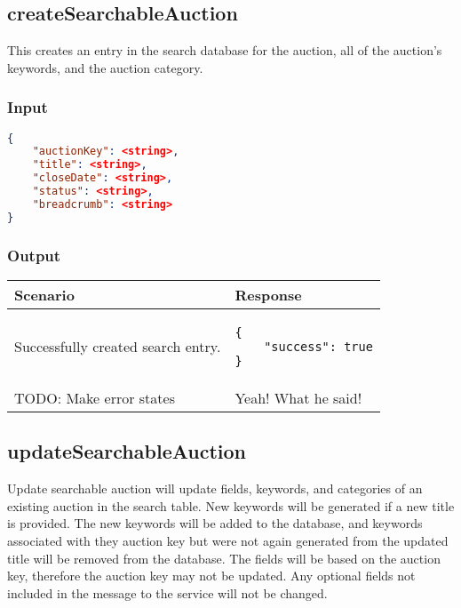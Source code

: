 \documentclass[12pt,a4paper]{article}
\begin{document}
\subsection{createSearchableAuction}
This creates an entry in the search database for the auction, all of the
auction's keywords, and the auction category.

\subsubsection{Input}
\begin{lstlisting}[language=json,firstnumber=1]
{
    "auctionKey": <string>,
    "title": <string>,
    "closeDate": <string>,
    "status": <string>,
    "breadcrumb": <string>
}
\end{lstlisting}

\subsubsection{Output}
\begin{center}
    \begin{tabular}{| p{5cm} | l |}
        \hline
        \textbf{Scenario} & \textbf{Response} \\
        \hline
        Successfully created search entry. & 
        \begin{lstlisting}[boxpos=t,language=tableJson,firstnumber=1]
{
    "success": true
}
        \end{lstlisting} \\ 
        \hline
            TODO: Make error states & Yeah! What he said! \\
        \hline
    \end{tabular}
\end{center}

\subsection{updateSearchableAuction}
Update searchable auction will update fields, keywords, and categories of an
existing auction in the search table. New keywords will be generated if a new
title is provided. The new keywords will be added to the database, and keywords
associated with they auction key but were not again generated from the updated
title will be removed from the database. The fields will be based on the
auction key, therefore the auction key may not be updated. Any optional fields
not included in the message to the service will not be changed.
\end{document}
